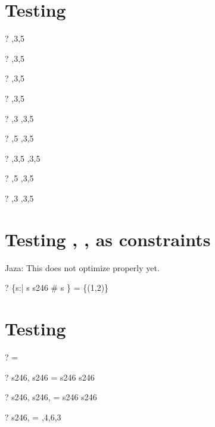\documentclass{article}
\begin{document}
\section{Testing \infix}
\begin{zed} \vdash? \langle \rangle  \infix   {},3,5 \rangle \end{zed}
\begin{zed} \vdash?  \rangle  \infix   {},3,5 \rangle \end{zed}
\begin{zed} \vdash?  \rangle  \infix   {},3,5 \rangle \end{zed}
\begin{zed} \vdash?  \rangle  \infix   {},3,5 \rangle \end{zed}
\begin{zed} \vdash? ,3 \rangle  \infix   {},3,5 \rangle \end{zed}
\begin{zed} \vdash? ,5 \rangle  \infix   {},3,5 \rangle \end{zed}
\begin{zed} \vdash? ,3,5 \rangle  \infix   {},3,5 \rangle \end{zed}
\begin{zed} \vdash? \lnot {},5 \rangle  \infix   {},3,5 \rangle \end{zed}
\begin{zed} \vdash? \lnot {},3 \rangle  \infix   {},3,5 \rangle \end{zed}

\section{Testing \prefix, \suffix, \infix as constraints}
Jaza: This does not optimize properly yet.  
\begin{zed} \vdash? \{s:\seq \nat | s \prefix s246 \land \# s \} = \power \{(1,2)\} \end{zed}

\section{Testing \dcat}
\begin{zed} \vdash? \dcat \langle \rangle = \emptyset[\nat \cross \num] \end{zed}
\begin{zed} \vdash? \dcat \langle s246, s246 \rangle = s246 \cat s246 \end{zed}
\begin{zed} \vdash? \dcat \langle s246, s246, \emptyset \rangle = s246 \cat s246 \end{zed}
\begin{zed} \vdash? \dcat \langle s246,  \rangle \rangle = ,4,6,3 \rangle \end{zed}
\end{document}

